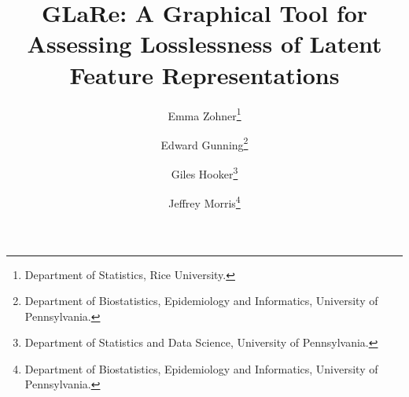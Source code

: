 \documentclass[12pt]{article}
\title{GLaRe: A Graphical Tool for Assessing
Losslessness of Latent Feature Representations}
\author{
Emma Zohner\thanks{Department of Statistics, Rice University.}
\and
Edward Gunning\thanks{Department of Biostatistics, Epidemiology and Informatics, University of Pennsylvania.}
\and
Giles Hooker\thanks{Department of Statistics and Data Science, University of Pennsylvania.} 
\and
Jeffrey Morris\thanks{Department of Biostatistics, Epidemiology and Informatics, University of Pennsylvania.}
}
\date{}
\newcommand{\1}{\mathbf{1}}
\begin{document}
\maketitle



\begin{abstract}

\end{abstract}

\clearpage

\tableofcontents

\clearpage








\clearpage

\appendix

\clearpage




\clearpage
\printbibliography
\end{document}
